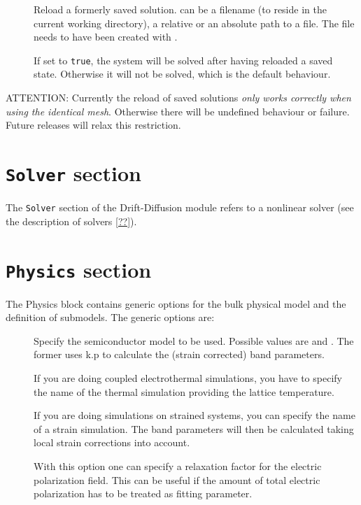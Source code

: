 \begin{description}
\item[] Reload a formerly saved solution.  can be a filename (to reside in the current working directory), a relative or an absolute path to a file. The file needs to have been created with .

\item[] If set to \texttt{true}, the system will be solved after having reloaded a saved state. Otherwise it will not be solved, which is the default behaviour.
\end{description}

ATTENTION: Currently the reload of saved solutions {\em only works correctly when using the identical mesh}.
Otherwise there will be undefined behaviour or failure.
Future releases will relax this restriction.


\section{\texttt{Solver} section}
The \texttt{Solver} section of the Drift-Diffusion module refers to a nonlinear solver (see the description of solvers \ref{??}).


\section{\texttt{Physics} section}

The Physics block contains generic options for the bulk physical model and the definition of submodels.
The generic options are:

\begin{description}
\item[] Specify the semiconductor model to be used. Possible values are  and . The former uses k.p to calculate the (strain corrected) band parameters. 

\item[] If you are doing coupled electrothermal simulations, you have to specify the name of the thermal simulation providing the lattice temperature. 

\item[] If you are doing simulations on strained systems, you can specify the name of a strain simulation. The band parameters will then be calculated taking local strain corrections into account.


\item[] With this option one can specify a relaxation factor for the electric polarization field. This can be useful if the amount of total electric polarization has to be treated as fitting parameter.
\end{description}


